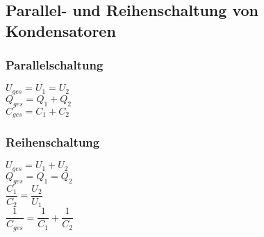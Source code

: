 \subsection{Parallel- und Reihenschaltung von Kondensatoren}
\subsubsection{Parallelschaltung}
$U_{ges} = U_{1} = U_{2}$
\vspace{2mm} \\
$Q_{ges} = Q_{1} + Q_{2}$
\vspace{2mm} \\
$C_{ges} = C_{1} + C_{2}$

\subsubsection{Reihenschaltung} 
$U_{ges} = U_{1} + U_{2}$
\vspace{2mm} \\
$Q_{ges} = Q_{1} = Q_{2}$
\vspace{3mm} \\
$\dfrac{C_{1}}{C_{2}} = \dfrac{U_{2}}{U_{1}}$
\vspace{3mm} \\
$\dfrac{1}{C_{ges}} = \dfrac{1}{C_{1}} + \dfrac{1}{C_{2}}$